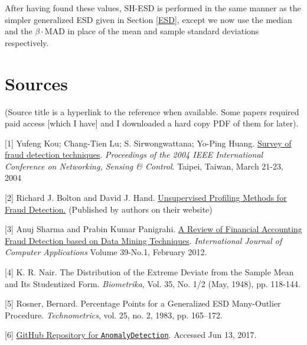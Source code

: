 \documentclass[12pt]{article}
\newcommand{\halfblankline}{\quad\vspace{-0.5\baselineskip}\pagebreak[3]}
\begin{document}
After having found these values, SH-ESD is performed in the same manner as the simpler generalized ESD given in Section \ref{ESD}, except we now use the median and the $\beta\cdot \text{MAD}$ in place of the mean and sample standard deviations respectively.




\section{Sources}
(Source title is a hyperlink to the reference when available. Some papers required paid access [which I have] and I downloaded a hard copy PDF of them for later).

 \vspace{1cm}


 [1]  Yufeng Kou; Chang-Tien Lu; S. Sirwongwattana; Yo-Ping Huang. \href{http://ieeexplore.ieee.org/document/1297040/?part=1}{Survey of fraud detection techniques}.  \textit{Proceedings of the 2004 IEEE International Conference on Networking, Sensing \& Control}. Taipei, Taiwan, March 21-23, 2004  

\halfblankline 
 
 [2] Richard J. Bolton and David J. Hand. \href{http://projetoaprendizagemgrupo4.pbworks.com/f/03.03%2520-%2520Unsupervised%2520Profiling%2520Methods%2520Fraud%2520Detection.pdf}{Unsupervised Profiling Methods for Fraud Detection.} (Published by authors on their website) 
 
\halfblankline 
 
 [3] Anuj Sharma and Prabin Kumar Panigrahi.
\href{https://arxiv.org/ftp/arxiv/papers/1309/1309.3944.pdf}{A Review of Financial Accounting Fraud Detection based on Data Mining Techniques}. \textit{International Journal of Computer Applications} Volume 39-No.1, February 2012. 

\halfblankline

[4] K. R. Nair. The Distribution of the Extreme Deviate from the Sample Mean and Its Studentized Form. \textit{Biometrika}, Vol. 35, No. 1/2 (May, 1948), pp. 118-144.

\halfblankline

[5] Rosner, Bernard. Percentage Points for a Generalized ESD Many-Outlier Procedure. \textit{Technometrics}, vol. 25, no. 2, 1983, pp. 165–172. 

\halfblankline

[6] \href{https://github.com/twitter/AnomalyDetection}{GitHub Repository for \texttt{AnomalyDetection}}. Accessed Jun 13, 2017. 
 
\end{document}
